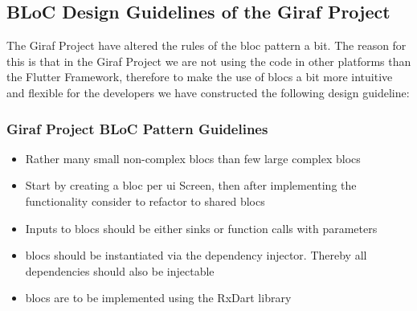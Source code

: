 \subsection{BLoC Design Guidelines of the Giraf Project}
The Giraf Project have altered the rules of the \gls{bloc} pattern a bit. The reason for this is that in the Giraf Project we are not using the code in other platforms than the Flutter Framework, therefore to make the use of \glspl{bloc} a bit more intuitive and flexible for the developers we have constructed the following design guideline:

\subsubsection{Giraf Project BLoC Pattern Guidelines}
\begin{itemize}
  \item Rather many small non-complex \glspl{bloc} than few large complex \glspl{bloc}
  \item Start by creating a \gls{bloc} per \gls{ui} Screen, then after implementing the functionality consider to refactor to shared \glspl{bloc}
  \item Inputs to \glspl{bloc} should be either sinks or function calls with parameters
  \item \glspl{bloc} should be instantiated via the dependency injector. Thereby all dependencies should also be injectable
  \item \glspl{bloc} are to be implemented using the RxDart library
\end{itemize}



